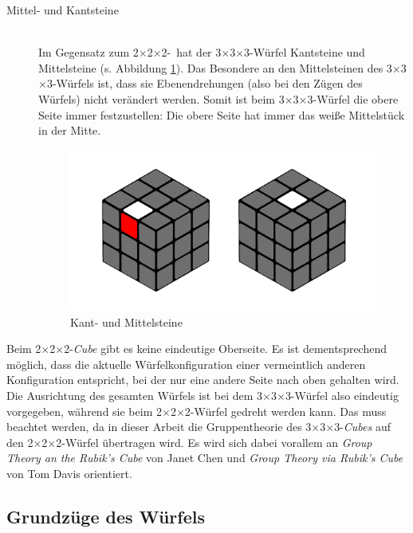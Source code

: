 \documentclass[12pt,a4paper, usenames, dvipsnames]{article}
\theoremstyle{mystyle}
\theoremstyle{definition}
\newcommand{\Ttwo}{2$\times$2$\times$2-}
\newcommand{\Tthree}{3$\times$3$\times$3-}
\begin{document}
\begin{description}
\newpage
\item[Mittel- und Kantsteine] \ \\
Im Gegensatz zum \Ttwo \ hat der \Tthree Würfel Kantsteine und Mittelsteine (s. Abbildung \ref{Abbildung_MittelKantSteine}).
Das Besondere an den Mittelsteinen des \Tthree Würfels ist, dass sie Ebenendrehungen (also bei den Zügen des Würfels) nicht verändert werden. Somit ist beim \Tthree Würfel die obere Seite immer festzustellen: Die obere Seite hat immer das weiße Mittelstück in der Mitte. 
\begin{figure}[H]
\centering
\includegraphics[scale=0.11]{mittelkant.png}
\caption[Kant- und Mittelsteine]{Kant- und Mittelsteine}
\label{Abbildung_MittelKantSteine}
\end{figure}



\end{description}

Beim \Ttwo \textit{Cube} gibt es keine eindeutige Oberseite. Es ist dementsprechend möglich, dass die aktuelle Würfelkonfiguration einer vermeintlich anderen Konfiguration entspricht, bei der nur eine andere Seite nach oben gehalten wird.
Die Ausrichtung des gesamten Würfels ist bei dem \Tthree Würfel also eindeutig vorgegeben, während sie beim \Ttwo Würfel gedreht werden kann.  
Das muss beachtet werden, da in dieser Arbeit die Gruppentheorie des \Tthree \textit{Cubes} auf den \Ttwo Würfel übertragen wird. Es wird sich dabei vorallem an \textit{Group Theory an the Rubik's Cube} von Janet Chen \cite{JC} und \textit{Group Theory via Rubik's Cube} von Tom Davis \cite{TD} orientiert.

%
%
%
%
%
%
%
%
%
%
%
%
%


\subsection{Grundzüge des Würfels} 
\end{document}
